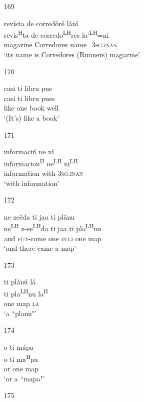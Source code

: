 \begin{itemize}
\item[169]
 
\glll   rev\'{i}sta de corred\v{o}r\'{e} l\v{a}n\v{i}\\
revis\textsuperscript{H}ta de corredo\textsuperscript{LH}res la'\textsuperscript{LH}=ni\\
magazine Corredores name=\textsc{3sg.inan}\\
\glt `its name is Corredores (Runners) magazine'
 


\item[170]
 
\glll   casi ti libru pue\\
 casi ti libru pues\\
like one book well\\
\glt `(It's) like a book'
 

\item[171]
 
\glll   informaci\'{n} ne n\v{i}\\
informacion\textsuperscript{H} ne\textsuperscript{LH} ni\textsuperscript{LH}\\
information with \textsc{3sg.inan}\\
\glt `with information'
 

\item[172]

\glll   ne ze\v{e}da ti jaa ti pl\v{a}nu\\
ne\textsuperscript{LH} z-ee\textsuperscript{LH}da  ti jaa ti pla\textsuperscript{LH}nu\\
and \textsc{fut}-come one \textsc{intj} one map\\
\glt `and there came a map'
 

\item[173]
 
\glll   ti pl\v{a}n\'{u} l\'{a}\\
 ti pla\textsuperscript{LH}nu la\textsuperscript{H}\\
one map \textsc{la}\\
\glt `a ``planu"'
 


\item[174]
 
\glll   o ti m\'{a}pa\\
o ti ma\textsuperscript{H}pa\\
or one map\\
\glt `or a ``mapa"'
 


\item[175]
 

\end{itemize}
